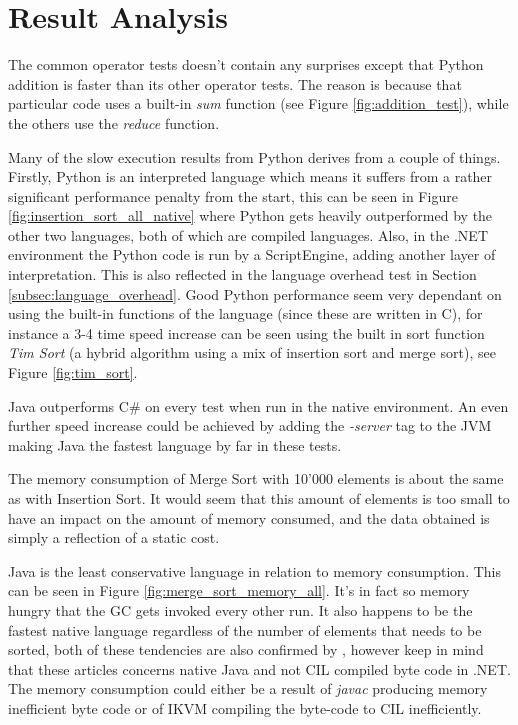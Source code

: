 \section{Result Analysis}

The common operator tests doesn't contain any surprises except that Python addition is faster than its other operator tests. The reason is because that particular code uses a built-in \textit{sum} function (see Figure \ref{fig:addition_test}), while the others use the \textit{reduce} function.

Many of the slow execution results from Python derives from a couple of things. Firstly, Python is an interpreted language which means it suffers from a rather significant performance penalty from the start, this can be seen in Figure \ref{fig:insertion_sort_all_native} where Python gets heavily outperformed by the other two languages, both of which are compiled languages. Also, in the .NET environment the Python code is run by a ScriptEngine, adding another layer of interpretation. This is also reflected in the language overhead test in Section \ref{subsec:language_overhead}. Good Python performance seem very dependant on using the built-in functions of the language (since these are written in C), for instance a 3-4 time speed increase can be seen using the built in sort function \textit{Tim Sort} (a hybrid algorithm using a mix of insertion sort and merge sort), see Figure \ref{fig:tim_sort}.

Java outperforms C\# on every test when run in the native environment. An even further speed increase could be achieved by adding the \textit{-server} tag to the JVM making Java the fastest language by far in these tests.

The memory consumption of Merge Sort with 10'000 elements is about the same as with Insertion Sort. It would seem that this amount of elements is too small to have an impact on the amount of memory consumed, and the data obtained is simply a reflection of a static cost.

Java is the least conservative language in relation to memory consumption. This can be seen in Figure \ref{fig:merge_sort_memory_all}. It's in fact so memory hungry that the GC gets invoked every other run. It also happens to be the fastest native language regardless of the number of elements that needs to be sorted, both of these tendencies are also confirmed by \cite{Benchmark} \cite{Benchmark2}, however keep in mind that these articles concerns native Java and not CIL compiled byte code in .NET. The memory consumption could either be a result of \textit{javac} producing memory inefficient byte code or of IKVM compiling the byte-code to CIL inefficiently.

